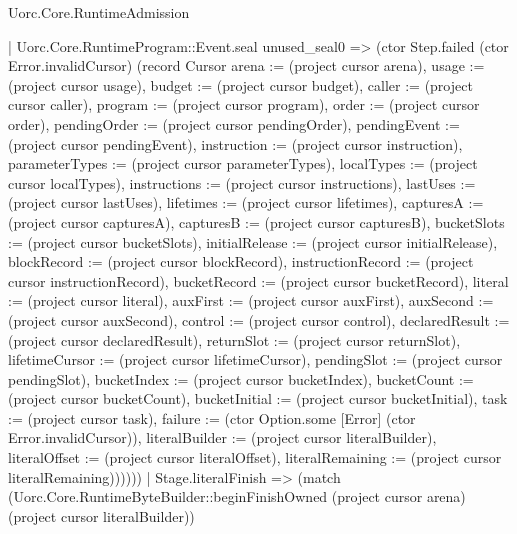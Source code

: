 \begin{lexlean}{Uorc.Core.RuntimeAdmission}
\begin{semanticmodule}
{          | Uorc.Core.RuntimeProgram::Event.seal unused_seal0 => (ctor Step.failed (ctor Error.invalidCursor) (record Cursor {arena := (project cursor arena), usage := (project cursor usage), budget := (project cursor budget), caller := (project cursor caller), program := (project cursor program), order := (project cursor order), pendingOrder := (project cursor pendingOrder), pendingEvent := (project cursor pendingEvent), instruction := (project cursor instruction), parameterTypes := (project cursor parameterTypes), localTypes := (project cursor localTypes), instructions := (project cursor instructions), lastUses := (project cursor lastUses), lifetimes := (project cursor lifetimes), capturesA := (project cursor capturesA), capturesB := (project cursor capturesB), bucketSlots := (project cursor bucketSlots), initialRelease := (project cursor initialRelease), blockRecord := (project cursor blockRecord), instructionRecord := (project cursor instructionRecord), bucketRecord := (project cursor bucketRecord), literal := (project cursor literal), auxFirst := (project cursor auxFirst), auxSecond := (project cursor auxSecond), control := (project cursor control), declaredResult := (project cursor declaredResult), returnSlot := (project cursor returnSlot), lifetimeCursor := (project cursor lifetimeCursor), pendingSlot := (project cursor pendingSlot), bucketIndex := (project cursor bucketIndex), bucketCount := (project cursor bucketCount), bucketInitial := (project cursor bucketInitial), task := (project cursor task), failure := (ctor Option.some [Error] (ctor Error.invalidCursor)), literalBuilder := (project cursor literalBuilder), literalOffset := (project cursor literalOffset), literalRemaining := (project cursor literalRemaining)})))))
      | Stage.literalFinish => (match (Uorc.Core.RuntimeByteBuilder::beginFinishOwned (project cursor arena) (project cursor literalBuilder))
}
\end{semanticmodule}
\end{lexlean}
